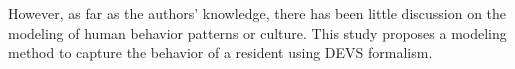 \documentclass{scsSimAUDPaperFormat}
\begin{document}
However, as far as the authors' knowledge, there has been little discussion on the modeling of human behavior patterns or culture. This study proposes a modeling method to capture the behavior of a resident using DEVS formalism. 



\end{document}
